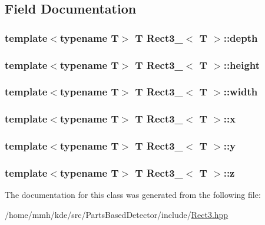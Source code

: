 \subsection{Field Documentation}
\hypertarget{classRect3___a73850e016f7e8152e47d430239c47cc2}{
\subsubsection[{depth}]{\setlength{\rightskip}{0pt plus 5cm}template$<$typename T$>$ T {\bf Rect3\-\_\-}$<$ T $>$\-::depth}}\label{classRect3___a73850e016f7e8152e47d430239c47cc2}
\hypertarget{classRect3___a4f10fdcf15fe8cdb6b01a9b90d56ebe5}{
\subsubsection[{height}]{\setlength{\rightskip}{0pt plus 5cm}template$<$typename T$>$ T {\bf Rect3\-\_\-}$<$ T $>$\-::height}}\label{classRect3___a4f10fdcf15fe8cdb6b01a9b90d56ebe5}
\hypertarget{classRect3___a780cbb24a81d6bbfff26c2ac6660beb8}{
\subsubsection[{width}]{\setlength{\rightskip}{0pt plus 5cm}template$<$typename T$>$ T {\bf Rect3\-\_\-}$<$ T $>$\-::width}}\label{classRect3___a780cbb24a81d6bbfff26c2ac6660beb8}
\hypertarget{classRect3___a035f211c0c365a9dbd15436cb5448e31}{
\subsubsection[{x}]{\setlength{\rightskip}{0pt plus 5cm}template$<$typename T$>$ T {\bf Rect3\-\_\-}$<$ T $>$\-::x}}\label{classRect3___a035f211c0c365a9dbd15436cb5448e31}
\hypertarget{classRect3___ab2c61e4e318bc064eb8bb707b699cbb6}{
\subsubsection[{y}]{\setlength{\rightskip}{0pt plus 5cm}template$<$typename T$>$ T {\bf Rect3\-\_\-}$<$ T $>$\-::y}}\label{classRect3___ab2c61e4e318bc064eb8bb707b699cbb6}
\hypertarget{classRect3___a99bae7d4f2bf0af6a3ffbfb0fa752b9e}{
\subsubsection[{z}]{\setlength{\rightskip}{0pt plus 5cm}template$<$typename T$>$ T {\bf Rect3\-\_\-}$<$ T $>$\-::z}}\label{classRect3___a99bae7d4f2bf0af6a3ffbfb0fa752b9e}


The documentation for this class was generated from the following file\-:\begin{DoxyCompactItemize}
\item 
/home/mmh/kde/src/\-Parts\-Based\-Detector/include/\hyperlink{Rect3_8hpp}{Rect3.\-hpp}\end{DoxyCompactItemize}
